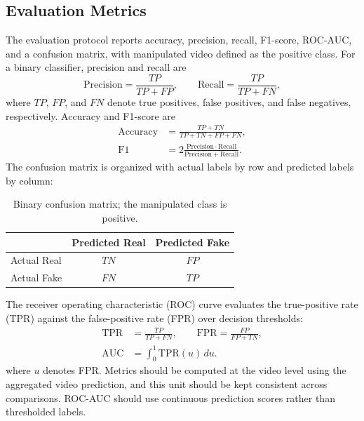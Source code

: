\subsection{Evaluation Metrics}
The evaluation protocol reports accuracy, precision, recall, F1-score, ROC-AUC, and a confusion matrix, with manipulated video defined as the positive class. For a binary classifier, precision and recall are
\begin{equation}
    \mathrm{Precision}=\frac{TP}{TP+FP}, \qquad
    \mathrm{Recall}=\frac{TP}{TP+FN},
\end{equation}
where $TP$, $FP$, and $FN$ denote true positives, false positives, and false negatives, respectively. Accuracy and F1-score are
\begin{equation}
    \begin{aligned}
        \mathrm{Accuracy}&=\frac{TP+TN}{TP+TN+FP+FN},\\
        \mathrm{F1}&=2\frac{\mathrm{Precision}\cdot\mathrm{Recall}}
        {\mathrm{Precision}+\mathrm{Recall}}.
    \end{aligned}
\end{equation}
The confusion matrix is organized with actual labels by row and predicted labels by column:
\begin{table}[t]
    \caption{Binary confusion matrix; the manipulated class is positive.}
    \label{tab:confusion-matrix}
    \centering
    \begin{tabular}{lcc}
        \toprule
        & Predicted Real & Predicted Fake \\
        \midrule
        Actual Real & $TN$ & $FP$ \\
        Actual Fake & $FN$ & $TP$ \\
        \bottomrule
    \end{tabular}
\end{table}
The receiver operating characteristic (ROC) curve evaluates the true-positive rate (TPR) against the false-positive rate (FPR) over decision thresholds:
\begin{equation}
    \begin{aligned}
        \mathrm{TPR}&=\frac{TP}{TP+FN},\qquad
        \mathrm{FPR}=\frac{FP}{FP+TN},\\
        \mathrm{AUC}&=\int_{0}^{1}\mathrm{TPR}(u)\,du.
    \end{aligned}
\end{equation}
where $u$ denotes FPR. Metrics should be computed at the video level using the aggregated video prediction, and this unit should be kept consistent across comparisons. ROC-AUC should use continuous prediction scores rather than thresholded labels.

